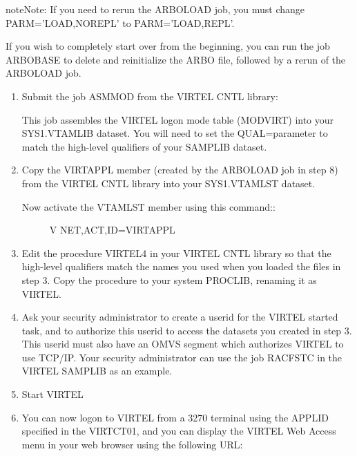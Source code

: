 \documentclass[letterpaper,10pt,english]{sphinxmanual}
\begin{document}
\begin{sphinxadmonition}{note}{Note:}
If you need to rerun the ARBOLOAD job, you must change PARM=’LOAD,NOREPL’ to PARM=’LOAD,REPL’.

If you wish to completely start over from the beginning, you can run the job ARBOBASE to delete and reinitialize the ARBO file, followed by a rerun of the ARBOLOAD job.
\end{sphinxadmonition}
\begin{enumerate}
\def\theenumi{\arabic{enumi}}
\def\labelenumi{\theenumi .}
\makeatletter\def\p@enumii{\p@enumi \theenumi .}\makeatother
\setcounter{enumi}{7}
\item {} 
Submit the job ASMMOD from the VIRTEL CNTL library:

This job assembles the VIRTEL logon mode table (MODVIRT) into your SYS1.VTAMLIB dataset.  You will need to set the QUAL=parameter to match the high-level qualifiers of your SAMPLIB dataset.

\item {} 
Copy the VIRTAPPL member (created by the ARBOLOAD job in step 8) from the VIRTEL CNTL library into your SYS1.VTAMLST dataset.
\begin{description}
\item[{Now activate the VTAMLST member using this command::}] \leavevmode
V NET,ACT,ID=VIRTAPPL

\end{description}

\item {} 
Edit the procedure VIRTEL4 in your VIRTEL CNTL library so that the high-level qualifiers match the names you used when you loaded the files in step 3.  Copy the procedure to your system PROCLIB, renaming it as VIRTEL.

\item {} 
Ask your security administrator to create a userid for the VIRTEL started task, and to authorize this userid to access the datasets you created in step 3. This userid must also have an OMVS segment which authorizes VIRTEL to use TCP/IP. Your security administrator can use the job RACFSTC in the VIRTEL SAMPLIB as an example.

\item {} 
Start VIRTEL

\item {} 
You can now logon to VIRTEL from a 3270 terminal using the APPLID specified in the VIRTCT01, and you can display the VIRTEL Web Access menu in your web browser using the following URL:


\end{enumerate}
\end{document}
